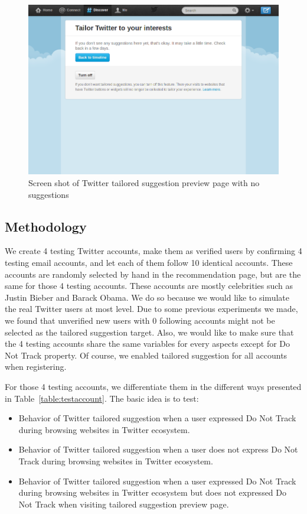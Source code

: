 \documentclass{sig-alternate}
\begin{document}
\begin{figure}
\begin{center}
\includegraphics[width=0.9\columnwidth]{nosug}
\end{center}
\caption{Screen shot of Twitter tailored suggestion preview page with no suggestions}
\label{fig:nosug}
\end{figure}

\subsection{Methodology} \label{sec:method}

We create 4 testing Twitter accounts, make them as verified users by confirming 4 testing email accounts, and let each of them follow 10 identical accounts. These accounts are randomly selected by hand in the recommendation page, but are the same for those 4 testing accounts. These accounts are mostly celebrities such as Justin Bieber and Barack Obama. We do so because we would like to simulate the real Twitter users at most level. Due to some previous experiments we made, we found that unverified new users with 0 following accounts might not be selected as the tailored suggestion target. Also, we would like to make sure that the 4 testing accounts share the same variables for every aspects except for Do Not Track property. Of course, we enabled tailored suggestion for all accounts when registering.

For those 4 testing accounts, we differentiate them in the different ways presented in Table~\ref{table:testaccount}. The basic idea is to test:
\begin{itemize}
\item Behavior of Twitter tailored suggestion when a user expressed Do Not Track during browsing websites in Twitter ecosystem.
\item Behavior of Twitter tailored suggestion when a user does not express Do Not Track during browsing websites in Twitter ecosystem.
\item Behavior of Twitter tailored suggestion when a user expressed Do Not Track during browsing websites in Twitter ecosystem but does not expressed Do Not Track when visiting tailored suggestion preview page.

\end{itemize} 
\end{document}

